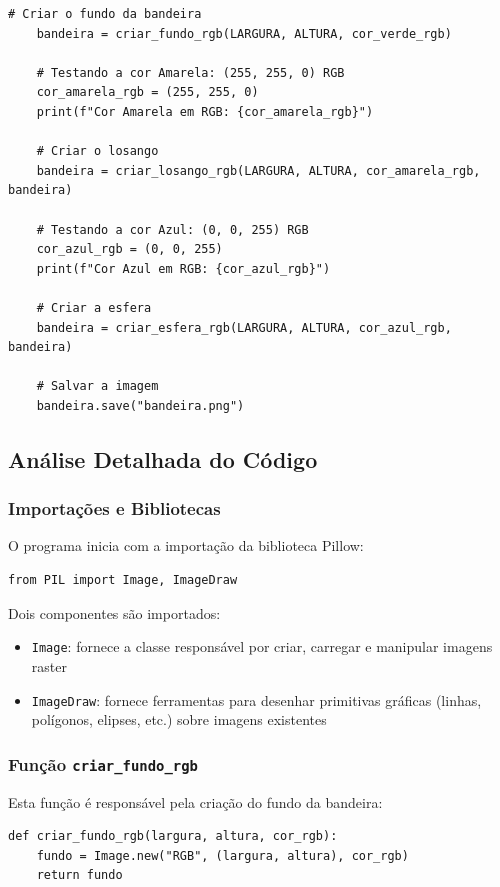 \documentclass{article}
\begin{document}
\begin{lstlisting}[style=pythonstyle, caption={Código completo para renderização da bandeira brasileira}, label={lst:codigo_completo}]
    # Criar o fundo da bandeira
    bandeira = criar_fundo_rgb(LARGURA, ALTURA, cor_verde_rgb)

    # Testando a cor Amarela: (255, 255, 0) RGB
    cor_amarela_rgb = (255, 255, 0)
    print(f"Cor Amarela em RGB: {cor_amarela_rgb}")

    # Criar o losango
    bandeira = criar_losango_rgb(LARGURA, ALTURA, cor_amarela_rgb, bandeira)

    # Testando a cor Azul: (0, 0, 255) RGB
    cor_azul_rgb = (0, 0, 255)
    print(f"Cor Azul em RGB: {cor_azul_rgb}")

    # Criar a esfera
    bandeira = criar_esfera_rgb(LARGURA, ALTURA, cor_azul_rgb, bandeira)

    # Salvar a imagem
    bandeira.save("bandeira.png")
\end{lstlisting}

\subsection{Análise Detalhada do Código}

\subsubsection{Importações e Bibliotecas}

O programa inicia com a importação da biblioteca Pillow:

\begin{lstlisting}[style=pythonstyle]
from PIL import Image, ImageDraw
\end{lstlisting}

Dois componentes são importados:
\begin{itemize}
    \item \texttt{Image}: fornece a classe responsável por criar, carregar e manipular imagens raster
    \item \texttt{ImageDraw}: fornece ferramentas para desenhar primitivas gráficas (linhas, polígonos, elipses, etc.) sobre imagens existentes
\end{itemize}

\subsubsection{Função \texttt{criar\_fundo\_rgb}}

Esta função é responsável pela criação do fundo da bandeira:

\begin{lstlisting}[style=pythonstyle]
def criar_fundo_rgb(largura, altura, cor_rgb):
    fundo = Image.new("RGB", (largura, altura), cor_rgb)
    return fundo
\end{lstlisting}
\end{document}
